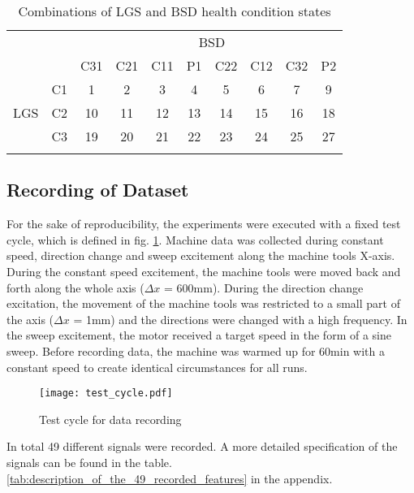 \begin{center}
\begin{longtable}{c c c c c c c c c c} 
\toprule
  &  &    &     &     &     \multicolumn{2}{c}{BSD}     &     &     &    \\ 
  &  & C31 & C21 & C11 & P1  & C22 & C12 & C32 & P2 \\ 
\midrule
     & \multicolumn{1}{c|}{C1} & 1 & 2 & 3 & 4 & 5 & 6 & 7 & 9 \\ 
 LGS & \multicolumn{1}{c|}{C2}& 10 & 11 & 12 & 13 & 14 & 15 & 16 & 18 \\  
     & \multicolumn{1}{c|}{C3} & 19 & 20 & 21 & 22 & 23 & 24 & 25 & 27 \\ 
\bottomrule
\caption {Combinations of LGS and BSD health condition states}
\label {tab:recorded_combinations_of_LGS_and_BSD_health_conditions}
\end{longtable}
\end{center}


\subsection{Recording of Dataset}
For the sake of reproducibility, the experiments were executed with a fixed test cycle, which is defined in fig. \ref{fig:test_cycle}. Machine data was collected during constant speed, direction change and sweep excitement along the machine tools X-axis. During the constant speed excitement, the machine tools were moved back and forth along the whole axis ($\Delta x$ = 600mm). During the direction change excitation, the movement of the machine tools was restricted to a small part of the axis ($\Delta x$ = 1mm) and the directions were changed with a high frequency. In the sweep excitement, the motor received a target speed in the form of a sine sweep. Before recording data, the machine was warmed up for 60min with a constant speed to create identical circumstances for all runs.

\begin{figure}[H]
  \centering
  \texttt{[image: test\_cycle.pdf]}
  \caption {Test cycle for data recording}
  \label{fig:test_cycle}
\end{figure}

In total 49 different signals were recorded. A more detailed specification of the signals can be found in the table. \ref{tab:description_of_the_49_recorded_features} in the appendix.

